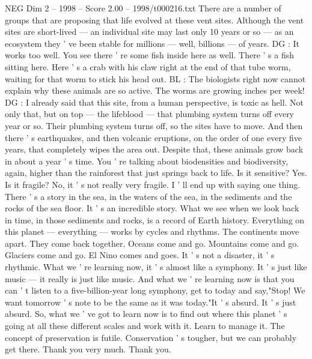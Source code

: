 \begin{textsample}{NEG Dim 2 – 1998 – Score 2.00 – 1998/t000216.txt}
There are a number of groups that are proposing that life evolved at these vent sites.
Although the vent sites are short-lived — an individual site may last only 10 years or so — as an ecosystem they ' ve been stable for millions — well, billions — of years.
DG : It works too well.
You see there ' re some fish inside here as well.
There ' s a fish sitting here.
Here ' s a crab with his claw right at the end of that tube worm, waiting for that worm to stick his head out.
BL : The biologists right now cannot explain why these animals are so active.
The worms are growing inches per week!
DG : I already said that this site, from a human perspective, is toxic as hell.
Not only that, but on top — the lifeblood — that plumbing system turns off every year or so.
Their plumbing system turns off, so the sites have to move.
And then there ' s earthquakes, and then volcanic eruptions, on the order of one every five years, that completely wipes the area out.
Despite that, these animals grow back in about a year ' s time.
You ' re talking about biodensities and biodiversity, again, higher than the rainforest that just springs back to life.
Is it sensitive?
Yes.
Is it fragile?
No, it ' s not really very fragile.
I ' ll end up with saying one thing.
There ' s a story in the sea, in the waters of the sea, in the sediments and the rocks of the sea floor.
It ' s an incredible story.
What we see when we look back in time, in those sediments and rocks, is a record of Earth history.
Everything on this planet — everything — works by cycles and rhythms.
The continents move apart.
They come back together.
Oceans come and go.
Mountains come and go.
Glaciers come and go.
El Nino comes and goes.
It ' s not a disaster, it ' s rhythmic.
What we ' re learning now, it ' s almost like a symphony.
It ' s just like music — it really is just like music.
And what we ' re learning now is that you can ' t listen to a five-billion-year long symphony, get to today and say,"Stop!
We want tomorrow ' s note to be the same as it was today."It ' s absurd.
It ' s just absurd.
So, what we ' ve got to learn now is to find out where this planet ' s going at all these different scales and work with it.
Learn to manage it.
The concept of preservation is futile.
Conservation ' s tougher, but we can probably get there.
Thank you very much.
Thank you.

\end{textsample}
